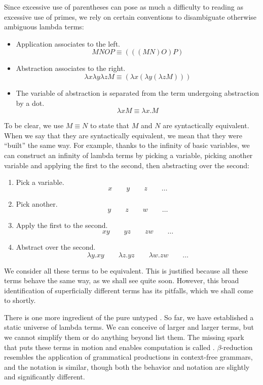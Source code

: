 Since excessive use of parentheses can pose as much a difficulty to reading as excessive use of primes, we rely on certain conventions to disambiguate otherwise ambiguous lambda terms:
\begin{itemize}
\item Application associates to the left.
\[
MNOP \equiv (((MN)O)P)
\]
\item Abstraction associates to the right.
\[
\lambda x \lambda y \lambda z M \equiv (\lambda x (\lambda y (\lambda z M)))
\]
\item The variable of abstraction is separated from the term undergoing abstraction by a dot.
\[
\lambda x M \equiv \lambda x . M
\]
\end{itemize}
To be clear, we use $M \equiv N$ to state that $M$ and $N$ are syntactically equivalent. When we say that they are syntactically equivalent, we mean that they were ``built'' the same way. For example, thanks to the infinity of basic variables, we can construct an infinity of lambda terms by picking a variable, picking another variable and applying the first to the second, then abstracting over the second:
\begin{enumerate}
\item Pick a variable.
\[
x \qquad y \qquad z \qquad \dotso
\]
\item Pick another.
\[
y \qquad z  \qquad w \qquad \dots
\]
\item Apply the first to the second.
\[
xy \qquad yz  \qquad zw \qquad \dots
\]
\item Abstract over the second.
\[
\lambda y . xy \qquad \lambda z . yz \qquad \lambda w . zw \qquad \dotso
\]
\end{enumerate}
We consider all these terms to be equivalent. This is justified because all these terms behave the same way, as we shall see quite soon. However, this broad identification of superficially different terms has its pitfalls, which we shall come to shortly.

There is one more ingredient of the pure untyped \lambdacalc{}. So far, we have established a static universe of lambda terms. We can conceive of larger and larger terms, but we cannot simplify them or do anything beyond list them. The missing spark that puts these terms in motion and enables computation is called . $\beta$-reduction resembles the application of grammatical productions in context-free grammars, and the notation is similar, though both the behavior and notation are slightly and significantly different.

